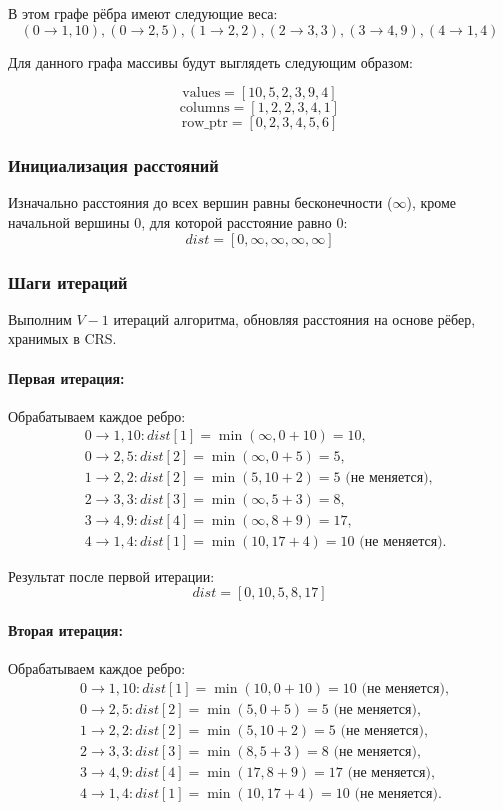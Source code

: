 \documentclass[12pt]{article}
\begin{document}
В этом графе рёбра имеют следующие веса:
\[
(0 \to 1, 10), (0 \to 2, 5), (1 \to 2, 2), (2 \to 3, 3), (3 \to 4, 9), (4 \to 1, 4)
\]

Для данного графа массивы будут выглядеть следующим образом:

\[
\text{values} = [10, 5, 2, 3, 9, 4]
\]
\[
\text{columns} = [1, 2, 2, 3, 4, 1]
\]
\[
\text{row\_ptr} = [0, 2, 3, 4, 5, 6]
\]

\subsubsection{Инициализация расстояний}

Изначально расстояния до всех вершин равны бесконечности (\(\infty\)), кроме начальной вершины \(0\), для которой расстояние равно \(0\):
\[
dist = [0, \infty, \infty, \infty, \infty]
\]

\subsubsection{Шаги итераций}

Выполним \(V-1\) итераций алгоритма, обновляя расстояния на основе рёбер, хранимых в CRS.

\paragraph{Первая итерация:}

Обрабатываем каждое ребро:
\[
\begin{aligned}
&0 \to 1, 10: dist[1] = \min(\infty, 0 + 10) = 10, \\
&0 \to 2, 5: dist[2] = \min(\infty, 0 + 5) = 5, \\
&1 \to 2, 2: dist[2] = \min(5, 10 + 2) = 5 \text{ (не меняется)}, \\
&2 \to 3, 3: dist[3] = \min(\infty, 5 + 3) = 8, \\
&3 \to 4, 9: dist[4] = \min(\infty, 8 + 9) = 17, \\
&4 \to 1, 4: dist[1] = \min(10, 17 + 4) = 10 \text{ (не меняется)}.
\end{aligned}
\]

Результат после первой итерации:
\[
dist = [0, 10, 5, 8, 17]
\]

\paragraph{Вторая итерация:}

Обрабатываем каждое ребро:
\[
\begin{aligned}
&0 \to 1, 10: dist[1] = \min(10, 0 + 10) = 10 \text{ (не меняется)}, \\
&0 \to 2, 5: dist[2] = \min(5, 0 + 5) = 5 \text{ (не меняется)}, \\
&1 \to 2, 2: dist[2] = \min(5, 10 + 2) = 5 \text{ (не меняется)}, \\
&2 \to 3, 3: dist[3] = \min(8, 5 + 3) = 8 \text{ (не меняется)}, \\
&3 \to 4, 9: dist[4] = \min(17, 8 + 9) = 17 \text{ (не меняется)}, \\
&4 \to 1, 4: dist[1] = \min(10, 17 + 4) = 10 \text{ (не меняется)}.
\end{aligned}
\]
\end{document}

